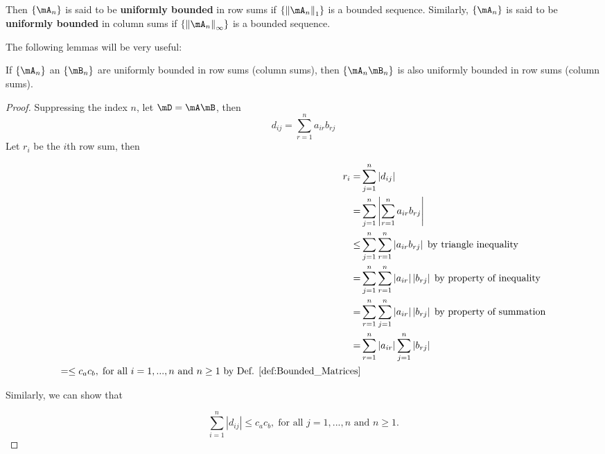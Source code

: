 \documentclass[english,12pt]{book}\usepackage[]{graphicx}\usepackage[]{xcolor}
\begin{document}
Then $\left\lbrace \mA_n \right\rbrace$ is said to be \textbf{uniformly bounded} in row sums if $\left\lbrace\left\|\mA_n\right\|_1\right\rbrace$ is a bounded sequence. Similarly, $\left\lbrace \mA_n \right\rbrace$ is said to be \textbf{uniformly bounded} in column sums if $\left\lbrace\left\|\mA_n\right\|_{\infty}\right\rbrace$ is a bounded sequence. 



The following lemmas will be very useful:

\begin{lemma}\label{lemma:bounded_lemma}
If $\left\lbrace \mA_n \right\rbrace$ an $\left\lbrace \mB_n \right\rbrace$ are uniformly bounded in row sums (column sums), then $\left\lbrace \mA_n \mB_n\right\rbrace$ is also uniformly bounded in row sums (column sums).
\end{lemma}

\begin{proof}
 Suppressing the index $n$, let $\mD = \mA\mB$, then
 \begin{equation}
  d_{ij} = \sum_{r = 1}^n a_{ir}b_{rj}
 \end{equation}
 Let $r_i$ be the $i$th row sum, then
 
 \begin{equation}
 \begin{aligned}
  r_i   = & \sum_{j = 1}^n \left|d_{ij}\right| \\
        = & \sum_{j = 1}^n \left|\sum_{r = 1}^n a_{ir}b_{rj}\right| \\
     \leq & \sum_{j = 1}^n \sum_{r = 1}^n \left|a_{ir}b_{rj}\right|\;\mbox{by triangle inequality} \\
      = & \sum_{j = 1}^n \sum_{r = 1}^n \left|a_{ir}\right|\left|b_{rj}\right|\;\mbox{by property of inequality} \\
      = & \sum_{r = 1}^n \sum_{j = 1}^n \left|a_{ir}\right|\left|b_{rj}\right|\;\mbox{by property of summation} \\
      = & \sum_{r = 1}^n \left|a_{ir}\right| \sum_{j = 1}^n \left|b_{rj}\right| \\
      =  \leq c_{a} c_{b},\; \mbox{for all $i = 1,..., n$ and $n\geq 1$ by Def. \ref{def:Bounded_Matrices}}
 \end{aligned}
 \end{equation}
 
 Similarly, we can show that 
 
 \begin{equation}
 \sum_{i = 1}^n \left|d_{ij}\right|\leq c_{a} c_{b},\; \mbox{for all $j = 1,..., n$ and $n\geq 1$.}
 \end{equation}
\end{proof}
\end{document}
